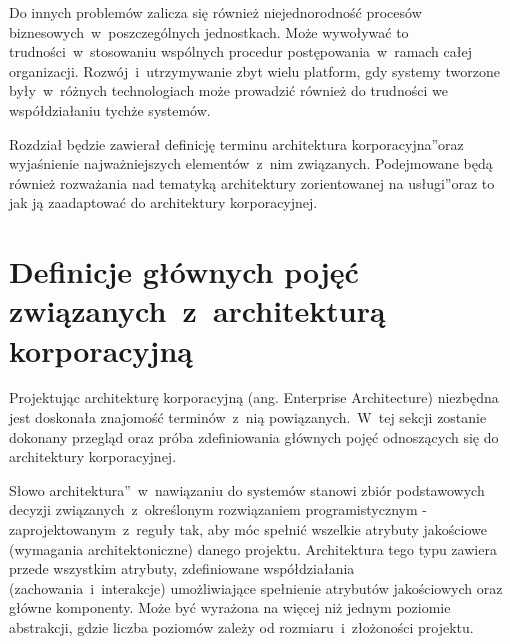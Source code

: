 Do innych problemów zalicza się również niejednorodność procesów biznesowych~w~poszczególnych jednostkach. Może wywoływać to trudności~w~stosowaniu wspólnych procedur postępowania~w~ramach całej organizacji. Rozwój~i~utrzymywanie zbyt wielu platform, gdy systemy tworzone były~w~różnych technologiach może prowadzić również do trudności we współdziałaniu tychże systemów.

Rozdział będzie zawierał definicję terminu \quotedblbase architektura korporacyjna\textquotedblright oraz wyjaśnienie najważniejszych elementów~z~nim związanych. Podejmowane będą również rozważania nad tematyką \quotedblbase architektury zorientowanej na usługi\textquotedblright oraz to jak ją zaadaptować do architektury korporacyjnej.

\section{Definicje głównych pojęć związanych~z~architekturą korporacyjną}
Projektując architekturę korporacyjną (ang. Enterprise Architecture) niezbędna jest doskonała znajomość terminów~z~nią powiązanych.~W~tej sekcji zostanie dokonany przegląd oraz próba zdefiniowania głównych pojęć odnoszących się do architektury korporacyjnej.

Słowo \quotedblbase architektura\textquotedblright~w~nawiązaniu do systemów stanowi zbiór podstawowych decyzji związanych~z~określonym rozwiązaniem programistycznym  - zaprojektowanym~z~reguły tak, aby móc spełnić wszelkie atrybuty jakościowe (wymagania architektoniczne) danego projektu. Architektura tego typu zawiera przede wszystkim atrybuty, zdefiniowane współdziałania (zachowania~i~interakcje) umożliwiające spełnienie atrybutów jakościowych oraz główne komponenty.  Może być wyrażona na więcej niż jednym poziomie abstrakcji, gdzie liczba poziomów zależy od rozmiaru~i~złożoności projektu. 


